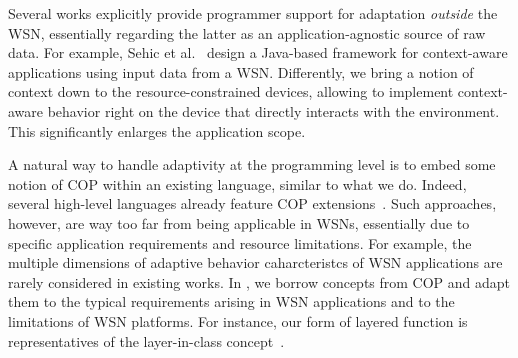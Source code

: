 
 Several works explicitly
provide programmer support for adaptation \emph{outside} the WSN,
essentially regarding the latter as an application-agnostic source of
raw data. For example, Sehic et al.~\cite{Sehic11} design a Java-based
framework for context-aware applications using input data from a
WSN. Differently, we bring a notion of context down to the
resource-constrained devices, allowing to implement context-aware
behavior right on the device that directly interacts with the
environment. This significantly enlarges the application scope.

A natural way to handle adaptivity at the programming level is to
embed some notion of COP within an existing language, similar to what
we do. Indeed, several high-level languages already feature COP
extensions~\cite{Kamina11,Salvaneschi12,Sehic11}.  Such approaches,
however, are way too far from being applicable in WSNs, essentially
due to specific application requirements and resource limitations. For
example, the multiple dimensions of adaptive behavior caharcteristcs
of WSN applications are rarely considered in existing works. In
\conesc, we borrow concepts from COP and adapt them to the typical
requirements arising in WSN applications and to the limitations of WSN
platforms. For instance, our form of layered function is
representatives of the layer-in-class concept~\cite{Salvaneschi12}.



